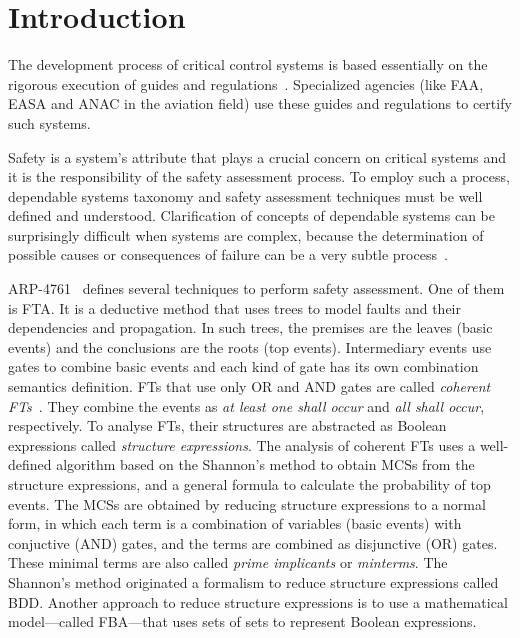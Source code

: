 \chapter{Introduction}
\label{chap:intro}

The development process of critical control systems is based essentially on the rigorous execution of guides and regulations~\cite{ANAC2011,FAA1993,FAA2007,SAE1996b}.
Specialized agencies (like FAA, EASA and ANAC in the aviation field) use these guides and regulations to certify such systems.

Safety is a system's attribute that plays a crucial concern on critical systems and it is the responsibility of the safety assessment process.
To employ such a process, dependable systems taxonomy and safety assessment techniques must be well defined and understood.
Clarification of concepts of dependable systems can be surprisingly difficult when systems are complex, because the determination of possible causes or consequences of failure can be a very subtle process~\cite{ALR+2004}.

ARP-4761~\cite{SAE1996b} defines several techniques to perform safety assessment.
One of them is \ac{FTA}.
It is a deductive method that uses trees to model faults and their dependencies and propagation.
In such trees, the premises are the leaves (basic events) and the conclusions are the roots (top events).
Intermediary events use gates to combine basic events and each kind of gate has its own combination semantics definition.
\Acp{FT} that use only \ac{OR} and \ac{AND} gates are called \emph{coherent \aclp{FT}}~\cite{Andrews2001,AB2003,Oliv2006,CCR2008,Vaurio2016}.
They combine the events as \emph{at least one shall occur} and \emph{all shall occur}, respectively.
To analyse \acp{FT}, their structures are abstracted as Boolean expressions called \emph{structure expressions}.
The analysis of coherent \acp{FT} uses a well-defined algorithm based on the Shannon's method to obtain \acp{MCS} from the structure expressions, and a general formula to calculate the probability of top events.
The \acp{MCS} are obtained by reducing structure expressions to a normal form, in which each term is a combination of variables (basic events) with conjuctive (\ac{AND}) gates, and the terms are combined as disjunctive (\ac{OR}) gates.
These minimal terms are also called \emph{prime implicants} or \emph{minterms}.
The Shannon's method originated a formalism to reduce structure expressions called \ac{BDD}.
Another approach to reduce structure expressions is to use a mathematical model---called \acf{FBA}---that uses sets of sets to represent Boolean expressions.


